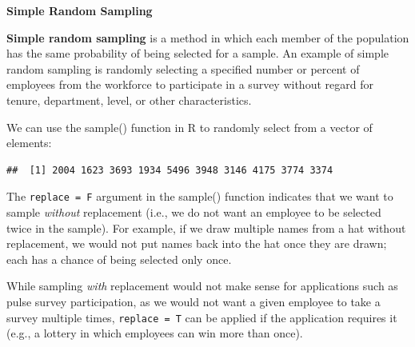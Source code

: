 \documentclass[]{book}
\newenvironment{Shaded}{\begin{snugshade}}{\end{snugshade}}
\newcommand{\CommentTok}[1]{\textcolor[rgb]{0.56,0.35,0.01}{\textit{#1}}}
\newcommand{\DataTypeTok}[1]{\textcolor[rgb]{0.13,0.29,0.53}{#1}}
\newcommand{\DecValTok}[1]{\textcolor[rgb]{0.00,0.00,0.81}{#1}}
\newcommand{\KeywordTok}[1]{\textcolor[rgb]{0.13,0.29,0.53}{\textbf{#1}}}
\newcommand{\NormalTok}[1]{#1}
\newcommand{\OperatorTok}[1]{\textcolor[rgb]{0.81,0.36,0.00}{\textbf{#1}}}
\newcommand{\StringTok}[1]{\textcolor[rgb]{0.31,0.60,0.02}{#1}}
\begin{document}
\textbf{Simple Random Sampling}

\textbf{Simple random sampling} is a method in which each member of the population has the same probability of being selected for a sample. An example of simple random sampling is randomly selecting a specified number or percent of employees from the workforce to participate in a survey without regard for tenure, department, level, or other characteristics.

We can use the sample() function in R to randomly select from a vector of elements:

\begin{Shaded}
\end{Shaded}

\begin{verbatim}
##  [1] 2004 1623 3693 1934 5496 3948 3146 4175 3774 3374
\end{verbatim}

The \texttt{replace\ =\ F} argument in the sample() function indicates that we want to sample \emph{without} replacement (i.e., we do not want an employee to be selected twice in the sample). For example, if we draw multiple names from a hat without replacement, we would not put names back into the hat once they are drawn; each has a chance of being selected only once.

While sampling \emph{with} replacement would not make sense for applications such as pulse survey participation, as we would not want a given employee to take a survey multiple times, \texttt{replace\ =\ T} can be applied if the application requires it (e.g., a lottery in which employees can win more than once).
\end{document}
